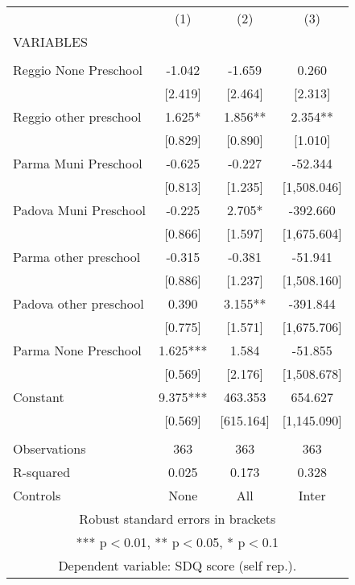 \begin{tabular}{lccc} \hline
 & (1) & (2) & (3) \\
VARIABLES &  &  &  \\ \hline
 &  &  &  \\
Reggio None Preschool & -1.042 & -1.659 & 0.260 \\
 & [2.419] & [2.464] & [2.313] \\
Reggio other preschool & 1.625* & 1.856** & 2.354** \\
 & [0.829] & [0.890] & [1.010] \\
Parma Muni Preschool & -0.625 & -0.227 & -52.344 \\
 & [0.813] & [1.235] & [1,508.046] \\
Padova Muni Preschool & -0.225 & 2.705* & -392.660 \\
 & [0.866] & [1.597] & [1,675.604] \\
Parma other preschool & -0.315 & -0.381 & -51.941 \\
 & [0.886] & [1.237] & [1,508.160] \\
Padova other preschool & 0.390 & 3.155** & -391.844 \\
 & [0.775] & [1.571] & [1,675.706] \\
Parma None Preschool & 1.625*** & 1.584 & -51.855 \\
 & [0.569] & [2.176] & [1,508.678] \\
Constant & 9.375*** & 463.353 & 654.627 \\
 & [0.569] & [615.164] & [1,145.090] \\
 &  &  &  \\
Observations & 363 & 363 & 363 \\
R-squared & 0.025 & 0.173 & 0.328 \\
 Controls & None & All & Inter \\ \hline
\multicolumn{4}{c}{ Robust standard errors in brackets} \\
\multicolumn{4}{c}{ *** p$<$0.01, ** p$<$0.05, * p$<$0.1} \\
\multicolumn{4}{c}{ Dependent variable: SDQ score (self rep.).} \\
\end{tabular}
